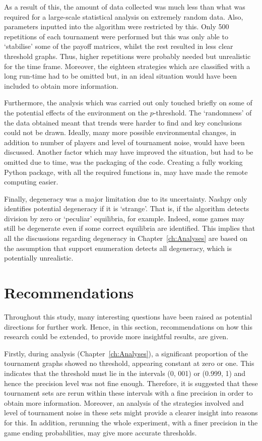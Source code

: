 As a result of this, the amount of data collected was much less than what was
required for a large-scale statistical analysis on extremely random data. Also,
parameters inputted into the algorithm were restricted by this. Only 500
repetitions of each tournament were performed but this was only able to
`stabilise' some of the payoff matrices, whilst the rest resulted in less clear
threshold graphs. Thus, higher repetitions were probably needed but
unrealistic for the time frame. Moreover, the eighteen strategies which are
classified with a long run-time had to be omitted but, in an ideal situation
would have been included to obtain more information.

Furthermore, the analysis which was carried out only touched briefly on some of
the potential effects of the environment on the \(p\)-threshold. The
`randomness' of the data obtained meant that trends were harder to find and key
conclusions could not be drawn. Ideally, many more possible environmental
changes, in addition to number of players and level of tournament noise, would
have been discussed. Another factor which may have improved the situation, but
had to be omitted due to time, was the packaging of the code. Creating a fully
working Python package, with all the required functions in, may have made the
remote computing easier.

Finally, degeneracy was a major limitation due to its uncertainty. Nashpy only
identifies potential degeneracy if it is `strange'. That is, if the algorithm
detects division by zero or `peculiar' equilibria, for example. Indeed, some
games may still be degenerate even if some correct equilibria are identified.
This implies that all the discussions regarding degeneracy in
Chapter~\ref{ch:Analyses} are based on the assumption that support enumeration
detects all degeneracy, which is potentially unrealistic.

\section{Recommendations}\label{sec:Recommendations}
Throughout this study, many interesting questions have been raised as potential
directions for further work. Hence, in this section, recommendations on how this
research could be extended, to provide more insightful results, are given.

Firstly, during analysis (Chapter~\ref{ch:Analyses}), a significant proportion
of the tournament graphs showed no threshold, appearing constant at zero or one.
This indicates that the threshold must lie in the intervals (0, 001) or (0.999,
1) and hence the precision level was not fine enough. Therefore, it is suggested
that these tournament sets are rerun within these intervals with a fine
precision in order to obtain more information. Moreover, an analysis of the
strategies involved and level of tournament noise in these sets might provide a
clearer insight into reasons for this. In addition, rerunning the whole
experiment, with a finer precision in the game ending probabilities, may give
more accurate thresholds.

